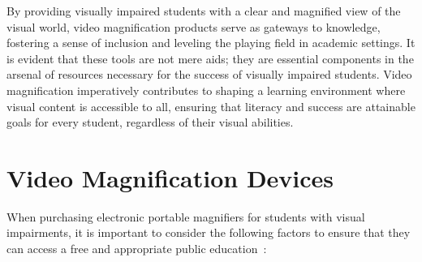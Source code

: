 By providing visually impaired students with a clear and magnified view of the visual world, video magnification products serve as gateways to knowledge, fostering a sense of inclusion and leveling the playing field in academic settings. It is evident that these tools are not mere aids; they are essential components in the arsenal of resources necessary for the success of visually impaired students. Video magnification imperatively contributes to shaping a learning environment where visual content is accessible to all, ensuring that literacy and success are attainable goals for every student, regardless of their visual abilities.

\section{Video Magnification Devices}\label{video-magnification-devices}

When purchasing electronic portable magnifiers for students with visual impairments, it is important to consider the following factors to ensure that they can access a free and appropriate public education~\cite{PerkinsVideoMagnifier}:

